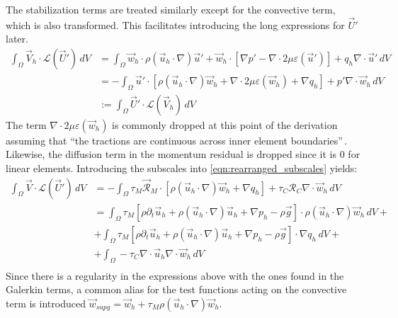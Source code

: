 The stabilization terms are treated similarly except for the convective term, which is also transformed. This facilitates introducing the long expressions for $\vec{U}'$ later.
\begin{equation}
	\begin{split}
		\int_{\Omega} \vec{V}_h \cdot \mathcal{L}(\vec{U}') \,dV &= \int_{\Omega} \vec{w}_h\cdot\rho(\vec{u}_h\cdot\nabla)\vec{u}' + \vec{w}_h\cdot \left[\nabla p' - \nabla\cdot2\mu\varepsilon(\vec{u}')\right] + q_h\nabla\cdot\vec{u}' \,dV\\
		&= -\int_{\Omega} \vec{u}'\cdot \left[\rho(\vec{u}_h\cdot\nabla)\vec{w}_h + \nabla\cdot2\mu\varepsilon(\vec{w}_h) + \nabla q_h\right] + p'\nabla\cdot\vec{w}_h\,dV\\
		& := \int_{\Omega} \vec{U}' \cdot \mathcal{L}(\vec{V}_h) \,dV
	\end{split}
	\label{eqn:rearranged_subscales}
\end{equation}
The term $\nabla\cdot2\mu\varepsilon(\vec{w}_h)$ is commonly dropped at this point of the derivation assuming that ``the tractions are continuous across inner element boundaries''\,\cite{Codina2002}. Likewise, the diffusion term in the momentum residual is dropped since it is 0 for linear elements. Introducing the subscales into \autoref{eqn:rearranged_subscales} yields:
\begin{align*}
	\int_{\Omega} \vec{V} \cdot \mathcal{L}(\vec{U}') \,dV & = -\int_{\Omega} \tau_M\vec{\mathcal{R}}_M\cdot \left[\rho(\vec{u}_h\cdot\nabla)\vec{w}_h + \nabla q_h\right] + \tau_C\mathcal{R}_C\nabla\cdot\vec{w}_h\,dV                      \\
	                                                       & = \int_{\Omega} \tau_M \left[\rho\partial_t \vec{u}_h + \rho(\vec{u}_{h}\cdot\nabla)\vec{u}_h + \nabla p_h - \rho \vec{g}\right] \cdot \rho(\vec{u}_h\cdot\nabla)\vec{w}_h\,dV + \\
	                                                       & +\int_{\Omega} \tau_M \left[\rho\partial_t \vec{u}_h + \rho(\vec{u}_{h}\cdot\nabla)\vec{u}_h + \nabla p_h - \rho \vec{g}\right] \cdot \nabla q_h\,dV +                           \\
	                                                       & + \int_{\Omega} -\tau_C\nabla\cdot\vec{u}_h\nabla\cdot\vec{w}_h\,dV                                                                                                              \\
\end{align*}
Since there is a regularity in the expressions above with the ones found in the Galerkin terms, a common alias for the test functions acting on the convective term is introduced $\vec{w}_{supg} = \vec{w}_h + \tau_M\rho(\vec{u}_h\cdot\nabla)\vec{w}_h$.
